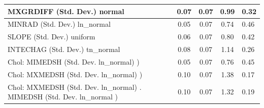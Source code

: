 \begin{table}
\begin{center}
\begin{tabular}{|l|l|c|c|c|l|}
			MXGRDIFF (Std. Dev.) normal &  & 0.07 & 0.07 & 0.99 & 0.32 \\
			\hline
			MINRAD (Std. Dev.) ln_normal &  & 0.05 & 0.07 & 0.74 & 0.46 \\
			\hline
			SLOPE (Std. Dev.) uniform &  & 0.06 & 0.07 & 0.80 & 0.42 \\
			\hline
			INTECHAG (Std. Dev.) tn_normal &  & 0.08 & 0.07 & 1.14 & 0.26 \\
			\hline
			 Chol: MIMEDSH (Std. Dev. ln_normal) ) &  & 0.05 & 0.07 & 0.76 & 0.45 \\
			\hline
			 Chol: MXMEDSH (Std. Dev. ln_normal) ) &  & 0.10 & 0.07 & 1.38 & 0.17 \\
			\hline
			 Chol: MXMEDSH (Std. Dev. ln_normal) . MIMEDSH (Std. Dev.   ln_normal ) &  & 0.10 & 0.07 & 1.32 & 0.19 \\
			\hline
		\end{tabular}
	\end{center}
\end{table}
